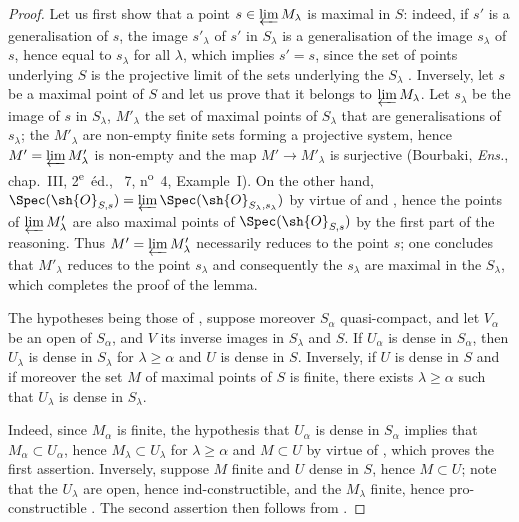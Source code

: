 \begin{proof}
Let us first show that a point $s\in\varprojlim M_\lambda$ is maximal in $S$: indeed, if $s'$ is a generalisation of $s$, the image $s'_\lambda$ of $s'$ in $S_\lambda$ is a generalisation of the image $s_\lambda$ of $s$, hence equal to $s_\lambda$ for all $\lambda$, which implies $s'=s$, since the set of points underlying $S$ is the projective limit of the sets underlying the $S_\lambda$ .
Inversely, let $s$ be a maximal point of $S$ and let us prove that it belongs to $\varprojlim M_\lambda$.
Let $s_\lambda$ be the image of $s$ in $S_\lambda$, $M'_\lambda$ the set of maximal points of $S_\lambda$ that are generalisations of $s_\lambda$; the $M'_\lambda$ are non-empty finite sets forming a projective system, hence $M'=\varprojlim M'_\lambda$ is non-empty and the map $M'\to M'_\lambda$ is surjective (Bourbaki, \emph{Ens.}, chap.~III, 2\textsuperscript{e}~\'ed., \textsection~7, n\textsuperscript{o}~4, Example~I).
On the other hand, $\Spec(\sh{O}_{S,s})=\varprojlim\Spec(\sh{O}_{S_\lambda,s_\lambda})$ by virtue of  and , hence the points of $\varprojlim M'_\lambda$ are also maximal points of $\Spec(\sh{O}_{S,s})$ by the first part of the reasoning.
Thus $M'=\varprojlim M'_\lambda$ necessarily reduces to the point $s$; one concludes that $M'_\lambda$ reduces to the point $s_\lambda$ and consequently the $s_\lambda$ are maximal in the $S_\lambda$, which completes the proof of the lemma.

\begin{lemma}[20.3.8.4]
\label{IV.20.3.8.4}
The hypotheses being those of , suppose moreover $S_\alpha$ quasi-compact, and let $V_\alpha$ be an open of $S_\alpha$, and $V$ its inverse images in $S_\lambda$ and $S$.
If $U_\alpha$ is dense in $S_\alpha$, then $U_\lambda$ is dense in $S_\lambda$ for $\lambda\geq\alpha$ and $U$ is dense in $S$.
Inversely, if $U$ is dense in $S$ and if moreover the set $M$ of maximal points of $S$ is finite, there exists $\lambda\geq\alpha$ such that $U_\lambda$ is dense in $S_\lambda$.
\end{lemma}

Indeed, since $M_\alpha$ is finite, the hypothesis that $U_\alpha$ is dense in $S_\alpha$ implies that $M_\alpha\subset U_\alpha$, hence $M_\lambda\subset U_\lambda$ for $\lambda\geq\alpha$ and $M\subset U$ by virtue of , which proves the first assertion.
Inversely, suppose $M$ finite and $U$ dense in $S$, hence $M\subset U$; note that the $U_\lambda$ are open, hence ind-constructible, and the $M_\lambda$ finite, hence pro-constructible .
The second assertion then follows from .


\end{proof}
